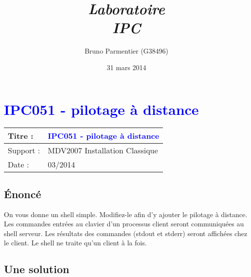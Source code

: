 \documentclass[french,10pt,a4paper]{article}
\begin{document}
\rfoot{\today}
\cfoot{ }
\renewcommand{\footrulewidth}{0.4pt}

\setlength{\parindent}{0pt} %

\lstset{frame=trBL}

\setcounter{tocdepth}{1}    %
\setcounter{secnumdepth}{5} %

\newcommand{\titre}{Titre du sujet} %


\title{\emph{Laboratoire\\\textbf{IPC}}}
\author{Bruno Parmentier (G38496)}
\date{31 mars 2014}
\maketitle
\thispagestyle{empty}
\newpage
%
\renewcommand{\titre}{\textcolor{blue}{ IPC051 - pilotage à distance }}

\lhead{ \titre }
\section{{\titre} }

\begin{tabular}{|l|l|}
\hline
Titre : 	& \titre \\\hline
Support : 	& MDV2007 Installation Classique \\\hline
Date :		& 03/2014 \\\hline
\end{tabular}

\subsection{Énoncé}

On vous donne un shell simple. Modifiez-le afin d’y ajouter le pilotage à
distance. Les commandes entrées au clavier d’un processus client seront
communiquées au shell serveur. Les résultats des commandes (stdout et stderr)
seront affichées chez le client. Le shell ne traite qu’un client à la fois.

\subsection{Une solution}
\end{document}
